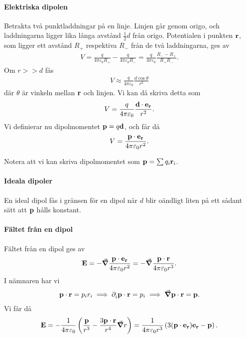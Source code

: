 \paragraph{Elektriska dipolen}
Betrakta två punktladdningar på en linje. Linjen går genom origo, och laddningarna ligger lika långa avstånd $\frac{1}{2}d$ från origo. Potentialen i punkten $\vb{r}$, som ligger ett avstånd $R_{+}$ respektiva $R_{-}$ från de två laddningarna, ges av
\begin{align*}
	V = \frac{q}{4\pi\varepsilon_{0}R_{+}} - \frac{q}{4\pi\varepsilon_{0}R_{-}} = \frac{q}{4\pi\varepsilon_{0}}\frac{R_{-} - R_{+}}{R_{+}R_{-}}.
\end{align*}
Om $r >> d$ fås
\begin{align*}
	V \approx \frac{q}{4\pi\varepsilon_{0}}\frac{d\cos{\theta}}{r^{2}}
\end{align*}
där $\theta$ är vinkeln mellan $\vb{r}$ och linjen. Vi kan då skriva detta som
\begin{align*}
	V = \frac{q}{4\pi\varepsilon_{0}}\frac{\vb{d}\cdot\vb{e}_{\vb{r}}}{r^{2}}.
\end{align*}
Vi definierar nu dipolmomentet $\vb{p} = q\vb{d}$, och får då
\begin{align*}
	V = \frac{\vb{p}\cdot\vb{e}_{\vb{r}}}{4\pi\varepsilon_{0}r^{2}}.
\end{align*}

Notera att vi kan skriva dipolmomentet som $\vb{p} = \sum q_{i}\vb{r}_{i}$.

\paragraph{Ideala dipoler}
En ideal dipol fås i gränsen för en dipol när $d$ blir oändligt liten på ett sådant sätt att $\vb{p}$ hålls konstant.

\paragraph{Fältet från en dipol}
Fältet från en dipol ges av
\begin{align*}
	\vb{E} = -\grad{\frac{\vb{p}\cdot\vb{e}_{\vb{r}}}{4\pi\varepsilon_{0}r^{2}}} = -\grad{\frac{\vb{p}\cdot\vb{r}}{4\pi\varepsilon_{0}r^{3}}}.
\end{align*}
I nämnaren har vi
\begin{align*}
	\vb{p}\cdot\vb{r} = p_{i}r_{i} \implies \partial_{i}^{}\vb{p}\cdot\vb{r} = p_{i} \implies \grad{\vb{p}\cdot\vb{r}} = \vb{p}.
\end{align*}
Vi får då
\begin{align*}
	\vb{E} = -\frac{1}{4\pi\varepsilon_{0}}\left(\frac{\vb{p}}{r^{3}} - \frac{3\vb{p}\cdot\vb{r}}{r^{4}}\grad{r}\right) = \frac{1}{4\pi\varepsilon_{0}r^{3}}\left(3(\vb{p}\cdot\vb{e}_{\vb{r}})\vb{e}_{\vb{r}} - \vb{p}\right).
\end{align*}

